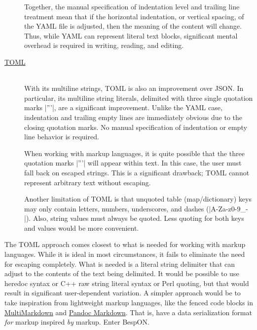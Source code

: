 \documentclass[11pt]{article}
\newcommand{\bespon}{BespON}
\begin{document}
\begin{description}
Together, the manual specification of indentation level and trailing line treatment mean that if the horizontal indentation, or vertical spacing, of the YAML file is adjusted, then the meaning of the content will change.  Thus, while YAML can represent literal text blocks, significant mental overhead is required in writing, reading, and editing.

\item[\href{https://github.com/toml-lang/toml}{TOML}]\hfill\\
With its multiline strings, TOML is also an improvement over JSON.  In particular, its multiline string literals, delimited with three single quotation marks |'''|, are a significant improvement.  Unlike the YAML case, indentation and trailing empty lines are immediately obvious due to the closing quotation marks.  No manual specification of indentation or empty line behavior is required.

When working with markup languages, it is quite possible that the three quotation marks |'''| will appear within text.  In this case, the user must fall back on escaped strings.  This is a significant drawback; TOML cannot represent arbitrary text without escaping.

Another limitation of TOML is that unquoted table (map/dictionary) keys may only contain letters, numbers, underscores, and dashes (|A-Za-z0-9_-|).  Also, string  values must always be quoted.  Less quoting for both keys and values would be more convenient.
\end{description}

The TOML approach comes closest to what is needed for working with markup languages.  While it is ideal in most circumstances, it fails to eliminate the need for escaping completely.  What is needed is a literal string delimiter that can adjust to the contents of the text being delimited.  It would be possible to use heredoc syntax or C++ raw string literal syntax or Perl quoting, but that would result in significant user-dependent variation.  A simpler approach would be to take inspiration from lightweight markup languages, like the fenced code blocks in \href{http://fletcherpenney.net/multimarkdown/}{MultiMarkdown} and \href{http://pandoc.org/README.html#pandocs-markdown}{Pandoc Markdown}.  That is, have a data serialization format \emph{for} markup inspired \emph{by} markup.  Enter \bespon.


%
\end{document}
